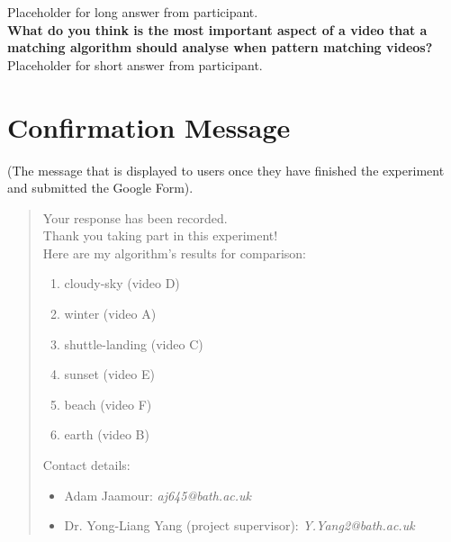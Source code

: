 Placeholder for long answer from participant.\\

\textbf{What do you think is the most important aspect of a video that a matching algorithm should analyse when pattern matching videos?}\\

Placeholder for short answer from participant.

\section{Confirmation Message}

(The message that is displayed to users once they have finished the experiment and submitted the Google Form).\\

\begin{quote}
    Your response has been recorded.\\

    Thank you taking part in this experiment!\\
    
    Here are my algorithm's results for comparison: 
    \begin{enumerate}
        \item cloudy-sky (video D)
        \item winter (video A)
        \item shuttle-landing (video C)
        \item sunset (video E)
        \item beach (video F)
        \item earth (video B)
    \end{enumerate}
    
    Contact details:
    \begin{itemize}
        \item Adam Jaamour: \textit{aj645@bath.ac.uk}
        \item Dr. Yong-Liang Yang (project supervisor): \textit{Y.Yang2@bath.ac.uk}
    \end{itemize}
\end{quote}
